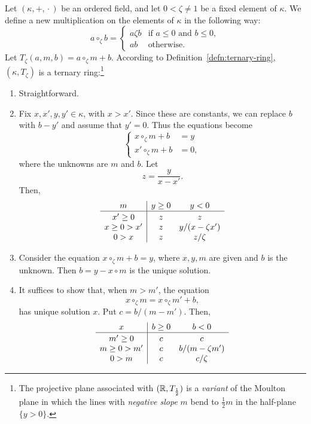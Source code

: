 \begin{xmpl}
    Let\/ $(\kappa,+,{}\cdot{})$ be an ordered field, and let\/ $0 < \zeta \ne 1$ be a fixed element of\/ $\kappa$. We define a new multiplication on the elements of\/ $\kappa$ in the following way:
    \[
    a\circ_\zeta b =
    \begin{cases}
        a\zeta b & \text{if } a\le0 \text{ and } b\le 0,\\
        ab & \text{otherwise}.
    \end{cases}
    \]
    Let $T_\zeta(a,m,b)=a\circ_\zeta m+b$. According to Definition~\ref{defn:ternary-ring}, $(\kappa,T_\zeta)$ is a ternary ring:\footnote{The projective plane associated with $(\mathbb{R},T_{\frac12})$ is a \textit{variant} of the Moulton plane in which the lines with \textit{negative slope} $m$ bend to $\frac12m$ in the half-plane $\{y>0\}$.}
    \begin{enumerate}[tr$_\arabic*$.,font=\scshape]
        \item Straightforward.
        
        \item Fix $x,x',y,y'\in\kappa$, with $x>x'$. Since these are constants, we can replace $b$ with $b-y'$ and assume that $y'=0$. Thus the equations become
        \[
            \left\{\begin{aligned}
                x\circ_\zeta m+b&=y\\
                x'\circ_\zeta m+b&=0,
            \end{aligned}
            \right.
        \]
        where the unknowns are $m$ and $b$. Let
        \[
            z = \frac y{x-x'}.
        \]
        Then,
        {\small
        \[
            \begin{array}{c|ccc}
                 m&y\ge0&y<0\\
                 \hline\rule{0pt}{10pt}
                 x'\ge0&z&z\\
                 x\ge0>x'&z&y/(x-\zeta x')\\
                 0>x&z&z/\zeta
            \end{array}
        \]}
        \item Consider the equation $x\circ_\zeta m+b=y$, where $x,y,m$ are given and $b$ is the unknown. Then $b=y-x\circ m$ is the unique solution.

        \item It suffices to show that, when $m>m'$, the equation
        \[
                x\circ_\zeta m=
                x\circ_\zeta m'+b,
        \]
        has unique solution $x$. Put $c=b/(m-m')$. Then,
        {\small\[
            \begin{array}{c|ccc}
                 x&b\ge0&b<0\\
                 \hline\rule{0pt}{10pt}
                 m'\ge0&c&c\\
                 m\ge0>m'&c&b/(m-\zeta m')\\
                 0>m&c&c/\zeta
            \end{array}
        \]}
    \end{enumerate}
\end{xmpl}

